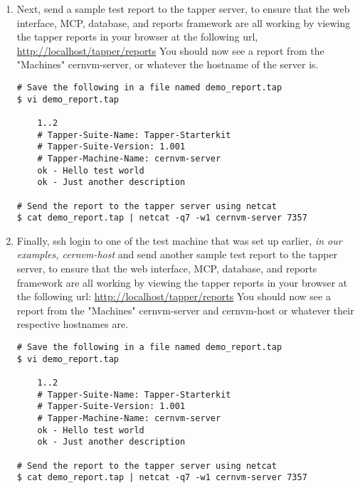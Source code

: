 \begin{enumerate}
\item Next, send a sample test report to the tapper server, to ensure that the web interface, MCP, database, and reports
framework are all working by viewing the tapper reports in your browser at the following url, 
\url{http://localhost/tapper/reports} You should now see a report from the "Machines"
cernvm-server, or whatever the hostname of the server is.
\lstset{caption= Send a Report to Server from Server}
\begin{lstlisting}
# Save the following in a file named demo_report.tap
$ vi demo_report.tap

	1..2
	# Tapper-Suite-Name: Tapper-Starterkit
	# Tapper-Suite-Version: 1.001
	# Tapper-Machine-Name: cernvm-server
	ok - Hello test world
	ok - Just another description

# Send the report to the tapper server using netcat
$ cat demo_report.tap | netcat -q7 -w1 cernvm-server 7357
\end{lstlisting}

\item Finally, ssh login to one of the test machine that was set up earlier, \emph{in our examples, cernvm-host} and send another 
sample test report to the tapper server, to ensure that the web interface, MCP, database, and reports framework are all working by
viewing the tapper reports in your browser at the following url: \url{http://localhost/tapper/reports} 
You should now see a report from the "Machines" cernvm-server and cernvm-host or whatever their respective hostnames are.
\lstset{caption= Send a Report to Server from a Test Client}
\begin{lstlisting}
# Save the following in a file named demo_report.tap
$ vi demo_report.tap

	1..2
	# Tapper-Suite-Name: Tapper-Starterkit
	# Tapper-Suite-Version: 1.001
	# Tapper-Machine-Name: cernvm-server
	ok - Hello test world
	ok - Just another description

# Send the report to the tapper server using netcat
$ cat demo_report.tap | netcat -q7 -w1 cernvm-server 7357
\end{lstlisting}

\end{enumerate}
